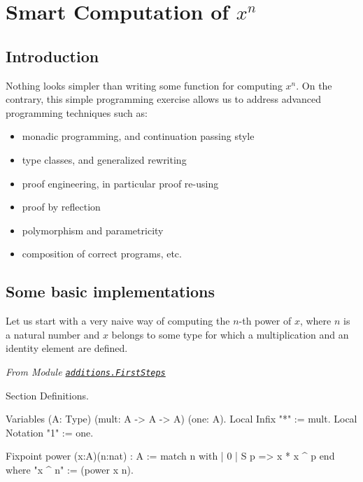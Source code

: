 \chapter{Smart Computation of \texorpdfstring{$x^n$}{Powers}}
\label{chapter-powers}
\section{Introduction}

Nothing looks simpler than writing some function for computing $x^n$.
On the contrary, this simple programming exercise allows us to address
advanced programming techniques such as:
\begin{itemize}
\item monadic programming, and continuation passing style
\item type classes, and generalized rewriting
\item proof engineering, in particular proof re-using
\item proof by reflection
\item polymorphism and parametricity
\item composition of correct programs, etc.
\end{itemize}



\section{Some basic implementations}
\label{sect:linear-naive}
Let us start with a very naive way of computing the $n$-th power of $x$, where
$n$ is a natural number and $x$ belongs to some type for which a multiplication and an identity element are defined.


\emph{From Module 
\href{../theories/html/hydras.additions.FirstSteps.html}{\texttt{additions.FirstSteps}}}
\label{sect: power-definitions}

\begin{Coqsrc}
Section Definitions.

Variables (A: Type)
           (mult: A -> A -> A)
           (one: A).
Local Infix "*" := mult.
Local Notation "1" := one.
\end{Coqsrc}

\begin{Coqsrc}
Fixpoint power (x:A)(n:nat) : A :=
  match n with 
   | 0%
   | S p =>   x * x ^ p
  end
where "x ^ n" := (power x n).

\end{Coqsrc}


